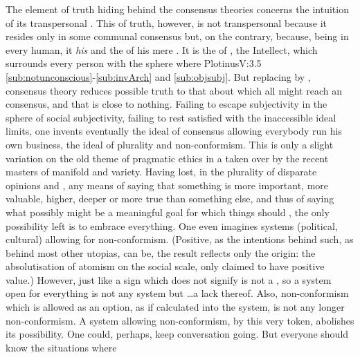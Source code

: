 The element of truth hiding behind the consensus theories concerns the
 intuition of its transpersonal . This  of
truth, however, is not transpersonal because it resides only in some communal
consensus but, on the contrary, because, being  in every human, it
 {\em his}  and the  of his mere
. It is the  of , the
Intellect, which surrounds every  person with the sphere where
\citet{the object known [is] identical with the knowing agent, the
  Intellectual-Principle, therefore, identical with the Intellectual
  Realm,}{Plotinus}{V:3.5\label{cit:actIsObject}}
\ref{sub:notunconscious}-\ref{sub:invArch} and \ref{sub:objsubj}.  But replacing
 by , consensus theory reduces possible truth
to that about which all might reach an  consensus, and that is close
to nothing.  Failing to escape  subjectivity in the sphere of social
subjectivity, failing to rest satisfied with the inaccessible ideal limits, one
invents eventually the ideal of consensus allowing everybody run his own
business, the ideal of plurality and non-conformism.
This is only a slight variation on the old theme of pragmatic ethics in a
 taken over by the recent masters of manifold and
variety.  Having lost, in the plurality of disparate opinions and
, any means of saying that something is more important, more
valuable, higher, deeper or more true than something else, and thus of saying
what possibly might be a meaningful goal for which things should , the
only possibility left is to embrace everything.  One even imagines systems
(political, cultural) allowing for non-conformism. (Positive, as the intentions
behind such, as behind most other utopias, can be, the result reflects only the
origin: the absolutisation of atomism on the social scale, only claimed to have
positive value.) However, just like a sign which does not signify is not a
, so a system open for everything is not any system but \ldots a lack
thereof. Also, non-conformism which is allowed as an option, as if calculated
into the system, is not any longer non-conformism.  A system allowing
non-conformism, by this very token, abolishes its possibility.  One could,
perhaps, keep conversation going.  But everyone should know the situations where
